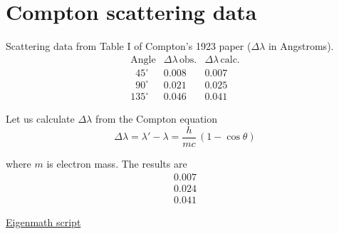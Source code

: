 

\section*{Compton scattering data}

Scattering data from Table I of Compton's 1923 paper ($\Delta\lambda$ in Angstroms).
\begin{equation*}
\begin{matrix}
\text{Angle} & \Delta\lambda\,\text{obs.} & \Delta\lambda\,\text{calc.}
\\[1ex]
\phantom{0}45^\circ & 0.008 & 0.007
\\
\phantom{0}90^\circ & 0.021 & 0.025
\\
135^\circ & 0.046 & 0.041
\end{matrix}
\end{equation*}

Let us calculate $\Delta\lambda$ from the Compton equation
\begin{equation*}
\Delta\lambda=\lambda'-\lambda=\frac{h}{mc}\,(1-\cos\theta)
\end{equation*}

where $m$ is electron mass.
The results are
\begin{equation*}
\begin{matrix}
0.007
\\
0.024
\\
0.041
\end{matrix}
\end{equation*}

\href{https://georgeweigt.github.io/examples/compton-scattering-data-demo.html}{Eigenmath script}


